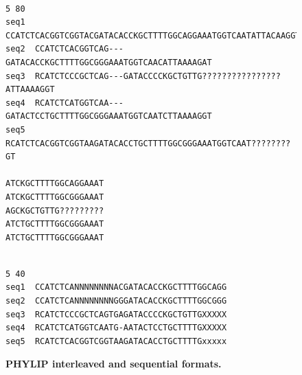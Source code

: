 \documentclass[a4paper,12pt]{article}
\begin{document}
\begin{figure}
\begin{small}
\begin{Verbatim}[frame=single, label=PHYLIP interleaved, samepage=true, baselinestretch=0.5]

5 80
seq1  CCATCTCACGGTCGGTACGATACACCKGCTTTTGGCAGGAAATGGTCAATATTACAAGGT
seq2  CCATCTCACGGTCAG---GATACACCKGCTTTTGGCGGGAAATGGTCAACATTAAAAGAT
seq3  RCATCTCCCGCTCAG---GATACCCCKGCTGTTG????????????????ATTAAAAGGT
seq4  RCATCTCATGGTCAA---GATACTCCTGCTTTTGGCGGGAAATGGTCAATCTTAAAAGGT
seq5  RCATCTCACGGTCGGTAAGATACACCTGCTTTTGGCGGGAAATGGTCAAT????????GT

ATCKGCTTTTGGCAGGAAAT
ATCKGCTTTTGGCGGGAAAT
AGCKGCTGTTG?????????
ATCTGCTTTTGGCGGGAAAT
ATCTGCTTTTGGCGGGAAAT

\end{Verbatim}
\begin{Verbatim}[frame=single, label=PHYLIP sequential, samepage=true, baselinestretch=0.5]

5 40
seq1  CCATCTCANNNNNNNNACGATACACCKGCTTTTGGCAGG
seq2  CCATCTCANNNNNNNNGGGATACACCKGCTTTTGGCGGG
seq3  RCATCTCCCGCTCAGTGAGATACCCCKGCTGTTGXXXXX
seq4  RCATCTCATGGTCAATG-AATACTCCTGCTTTTGXXXXX
seq5  RCATCTCACGGTCGGTAAGATACACCTGCTTTTGxxxxx

\end{Verbatim}
\end{small}
\label{fig:align_tree}
\caption{\bf PHYLIP interleaved and sequential formats.}
\end{figure}
\end{document}
